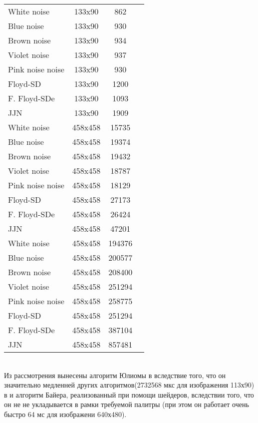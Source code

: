 \begin{tabular}{|@{\hspace*{2mm}}l||*{3}{c|}}\hline

	&\makebox[12em]{Размер, пиксели}&\makebox[6em]{Время, мкс}
	\\\hline\hline
	White noise&133x90&862\\\hline
	Blue noise&133x90&930\\\hline
	Brown noise&133x90&934\\\hline
	Violet noise &133x90&937\\\hline
	Pink noise noise&133x90&930\\\hline
	Floyd-SD&133x90&1200\\\hline
	F. Floyd-SDe&133x90&1093\\\hline
	JJN &133x90&1909\\\hline
	White noise&458x458&15735\\\hline
	Blue noise&458x458&19374\\\hline
	Brown noise&458x458&19432\\\hline
	Violet noise &458x458&18787\\\hline
	Pink noise noise&458x458&18129\\\hline
	Floyd-SD&458x458&27173\\\hline
	F. Floyd-SDe&458x458&26424\\\hline
	JJN &458x458&47201\\\hline
	White noise&458x458&194376\\\hline
	Blue noise&458x458&200577\\\hline
	Brown noise&458x458&208400\\\hline
	Violet noise &458x458&251294\\\hline
	Pink noise noise&458x458&258775\\\hline
	Floyd-SD&458x458&251294\\\hline
	F. Floyd-SDe&458x458&387104\\\hline
	JJN &458x458&857481\\\hline
\end{tabular}
\bigskip
\\
Из рассмотрения вынесены алгоритм Юлиомы в вследствие того, что он значительно медленней других алгоритмов(2732568 мкс для изображения 113х90) в и алгоритм Байера, реализованный при помощи шейдеров, вследствии того, что он не не укладывается в рамки требуемой палитры (при этом он работает очень быстро 64 мс для изображени 640х480).
